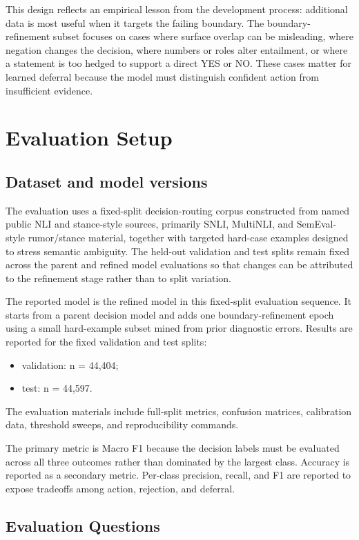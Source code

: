 \documentclass[11pt]{article}
\begin{document}
This design reflects an empirical lesson from the development process: additional data is most useful when it targets the failing boundary. The boundary-refinement subset focuses on cases where surface overlap can be misleading, where negation changes the decision, where numbers or roles alter entailment, or where a statement is too hedged to support a direct YES or NO. These cases matter for learned deferral because the model must distinguish confident action from insufficient evidence.

\section{Evaluation Setup}
\subsection{Dataset and model versions}

The evaluation uses a fixed-split decision-routing corpus constructed from named public NLI and stance-style sources, primarily SNLI, MultiNLI, and SemEval-style rumor/stance material, together with targeted hard-case examples designed to stress semantic ambiguity. The held-out validation and test splits remain fixed across the parent and refined model evaluations so that changes can be attributed to the refinement stage rather than to split variation.

The reported model is the refined model in this fixed-split evaluation sequence. It starts from a parent decision model and adds one boundary-refinement epoch using a small hard-example subset mined from prior diagnostic errors. Results are reported for the fixed validation and test splits:
\begin{itemize}[leftmargin=1.5em]
  \item validation: n = 44,404;
  \item test: n = 44,597.
\end{itemize}

The evaluation materials include full-split metrics, confusion matrices, calibration data, threshold sweeps, and reproducibility commands.

The primary metric is Macro F1 because the decision labels must be evaluated across all three outcomes rather than dominated by the largest class. Accuracy is reported as a secondary metric. Per-class precision, recall, and F1 are reported to expose tradeoffs among action, rejection, and deferral.

\subsection{Evaluation Questions}
\end{document}
